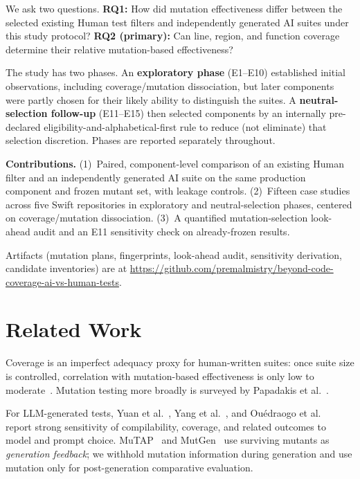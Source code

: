 \documentclass[10pt,conference]{IEEEtran}
\begin{document}
We ask two questions. \textbf{RQ1:} How did mutation effectiveness differ between the selected existing Human test filters and independently generated AI suites under this study protocol? \textbf{RQ2 (primary):} Can line, region, and function coverage determine their relative mutation-based effectiveness?

The study has two phases. An \textbf{exploratory phase} (E1--E10) established initial observations, including coverage/mutation dissociation, but later components were partly chosen for their likely ability to distinguish the suites. A \textbf{neutral-selection follow-up} (E11--E15) then selected components by an internally pre-declared eligibility-and-alphabetical-first rule to reduce (not eliminate) that selection discretion. Phases are reported separately throughout.

\textbf{Contributions.} (1)~Paired, component-level comparison of an existing Human filter and an independently generated AI suite on the same production component and frozen mutant set, with leakage controls. (2)~Fifteen case studies across five Swift repositories in exploratory and neutral-selection phases, centered on coverage/mutation dissociation. (3)~A quantified mutation-selection look-ahead audit and an E11 sensitivity check on already-frozen results.

Artifacts (mutation plans, fingerprints, look-ahead audit, sensitivity derivation, candidate inventories) are at \url{https://github.com/premalmistry/beyond-code-coverage-ai-vs-human-tests}.

\section{Related Work}
Coverage is an imperfect adequacy proxy for human-written suites: once suite size is controlled, correlation with mutation-based effectiveness is only low to moderate~\cite{inozemtseva2014}. Mutation testing more broadly is surveyed by Papadakis et al.~\cite{papadakis2019survey}.

For LLM-generated tests, Yuan et al.~\cite{yuan2023}, Yang et al.~\cite{yang2024ase}, and Ou\'{e}draogo et al.~\cite{ouedraogo2026} report strong sensitivity of compilability, coverage, and related outcomes to model and prompt choice. MuTAP~\cite{mutap2024} and MutGen~\cite{mutgen2026} use surviving mutants as \emph{generation feedback}; we withhold mutation information during generation and use mutation only for post-generation comparative evaluation.
\end{document}

